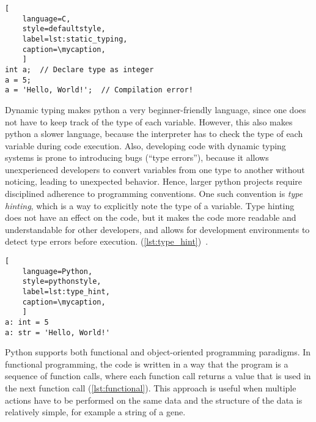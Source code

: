 \def\mycaption{ Example of static typing in C. The variable ``\texttt{a}'' is declared as
    an integer, and can only store integers. The variable ``\texttt{a}'' is then assigned
    the value 5, which is an integer. The variable ``\texttt{a}'' is then assigned the
    value \texttt{'Hello, World!'}, which is a string. This results in a compilation
    error, because the variable ``\texttt{a}'' can only store integers.}
\begin{lstlisting}[
    language=C,
    style=defaultstyle,
    label=lst:static_typing,
    caption=\mycaption,
    ]
int a;  // Declare type as integer
a = 5;
a = 'Hello, World!';  // Compilation error!
\end{lstlisting}
Dynamic typing makes python a very beginner-friendly language, since one does
not have to keep track of the type of each variable. However, this also makes
python a slower language, because the interpreter has to check the type of each
variable during code execution. Also, developing code with dynamic typing
systems is prone to introducing bugs (``type errors''), because it allows
unexperienced developers to convert variables from one type to another without
noticing, leading to unexpected behavior. Hence, larger python projects require
disciplined adherence to programming conventions. One such convention is
\textit{type hinting}, which is a way to explicitly note the type of a
variable. Type hinting does not have an effect on the code, but it makes the
code more readable and understandable for other developers, and allows for
development environments to detect type errors before execution.
(\autoref{lst:type_hint})~\cite{vanrossumPEP484Type2014}.

\def\mycaption{
    Example of type hints used in python. Explicitly stating the type of the
    variable is optional and does not change the behavior of the code as shown in
    \autoref{lst:dynamic_typing}.}
\begin{lstlisting}[
    language=Python,
    style=pythonstyle,
    label=lst:type_hint,
    caption=\mycaption,
    ]
a: int = 5
a: str = 'Hello, World!'
\end{lstlisting}


Python supports both functional and object-oriented programming paradigms. In
functional programming, the code is written in a way that the program is a
sequence of function calls, where each function call returns a value that is
used in the next function call (\autoref{lst:functional}). This approach is
useful when multiple actions have to be performed on the same data and the
structure of the data is relatively simple, for example a string of a gene.

